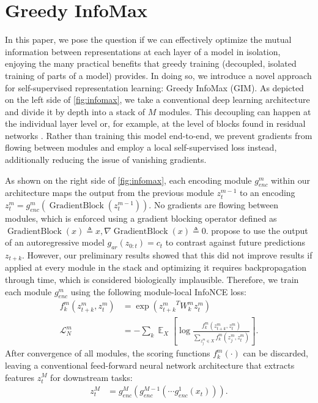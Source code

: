 \documentclass{article}
\newcommand{\ztk}{z_{t+k}}
\newcommand{\zt}{z_{t}}
\newcommand{\Wk}{W_{k}}
\newcommand{\loss}{\mathcal{L}_N}
\newcommand{\expectation}{\mathop{\mathbb{E}}}
\DeclareMathOperator{\gradblock}{GradientBlock}
\begin{document}
\section{Greedy InfoMax} \label{sec:decouple}


In this paper, we pose the question if we can effectively optimize the mutual information between representations at each layer of a model in isolation, enjoying the many practical benefits that greedy training (decoupled, isolated training of parts of a model) provides. In doing so, we introduce a novel approach for self-supervised representation learning: Greedy InfoMax (GIM). As depicted on the left side of \cref{fig:infomax}, we take a conventional deep learning architecture and divide it by depth into a stack of $M$ modules. This decoupling can happen at the individual layer level or, for example, at the level of blocks found in residual networks \citep{he2016identity}. Rather than training this model end-to-end, we prevent gradients from flowing between modules and employ a local self-supervised loss instead, additionally reducing the issue of vanishing gradients.



As shown on the right side of \cref{fig:infomax}, each encoding module $g_{enc}^m$ within our architecture maps the output from the previous module $\zt^{m-1}$ to an encoding $\zt^m = g_{enc}^m(\gradblock(\zt^{m-1}))$. No gradients are flowing between modules, which is enforced using a gradient blocking operator defined as  $\gradblock(x) \triangleq x, \nabla\gradblock(x) \triangleq 0$. \citet{oord2018representation} propose to use the output of an autoregressive model $g_{ar}(z_{0:t}) = c_t$ to contrast against future predictions $\ztk$. However, our preliminary results showed that this did not improve results if applied at every module in the stack and optimizing it requires backpropagation through time, which is considered biologically implausible. Therefore, we train each module $g_{enc}^m$ using the following module-local InfoNCE loss: \begin{align}\label{eq:logbi2}
f_k^m(\ztk^m, \zt^m) &= \exp \left({\ztk^m}^T \Wk^m \zt^m\right) \\
    \loss^m &= - \sum_k \expectation_X \left[ \log \frac{f_k^m(\ztk^m, \zt^m)}{\sum_{z^m_j \in X} f_k^m(z_j^m, \zt^m)} \right] .\label{eq:infoncegreedy}
\end{align}
After convergence of all modules, the scoring functions $f_k^m(\cdot)$ can be discarded, leaving a conventional feed-forward neural network architecture that extracts features $z^M_t$ for downstream tasks:
\begin{align}
    z^M_t &= g_{enc}^M\left(g_{enc}^{M-1}\left(\cdots g_{enc}^{1}\left(x_t\right)\right)\right) .
\end{align}
\end{document}
